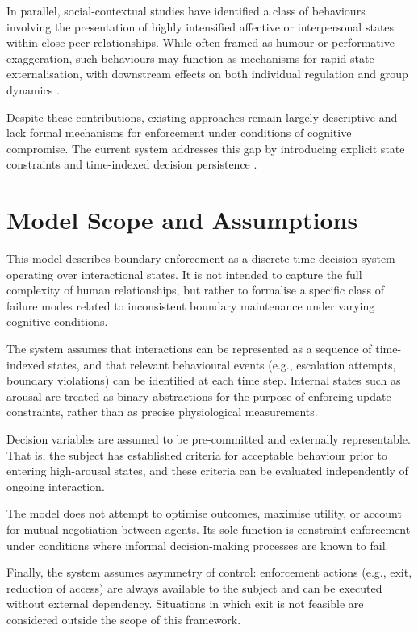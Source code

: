 \documentclass{article}
\begin{document}
	In parallel, social-contextual studies have identified a class of behaviours involving the presentation of highly intensified affective or interpersonal states within close peer relationships. While often framed as humour or performative exaggeration, such behaviours may function as mechanisms for rapid state externalisation, with downstream effects on both individual regulation and group dynamics \cite{temporal_inconsistency}.
	
	Despite these contributions, existing approaches remain largely descriptive and lack formal mechanisms for enforcement under conditions of cognitive compromise. The current system addresses this gap by introducing explicit state constraints and time-indexed decision persistence \cite{constraint_relaxation, delayed_enforcement}.
	
	\section*{Model Scope and Assumptions}
	
	This model describes boundary enforcement as a discrete-time decision system operating over interactional states. It is not intended to capture the full complexity of human relationships, but rather to formalise a specific class of failure modes related to inconsistent boundary maintenance under varying cognitive conditions.
	
	The system assumes that interactions can be represented as a sequence of time-indexed states, and that relevant behavioural events (e.g., escalation attempts, boundary violations) can be identified at each time step. Internal states such as arousal are treated as binary abstractions for the purpose of enforcing update constraints, rather than as precise physiological measurements.
	
	Decision variables are assumed to be pre-committed and externally representable. That is, the subject has established criteria for acceptable behaviour prior to entering high-arousal states, and these criteria can be evaluated independently of ongoing interaction.
	
	The model does not attempt to optimise outcomes, maximise utility, or account for mutual negotiation between agents. Its sole function is constraint enforcement under conditions where informal decision-making processes are known to fail.
	
	Finally, the system assumes asymmetry of control: enforcement actions (e.g., exit, reduction of access) are always available to the subject and can be executed without external dependency. Situations in which exit is not feasible are considered outside the scope of this framework.
	
\end{document}
